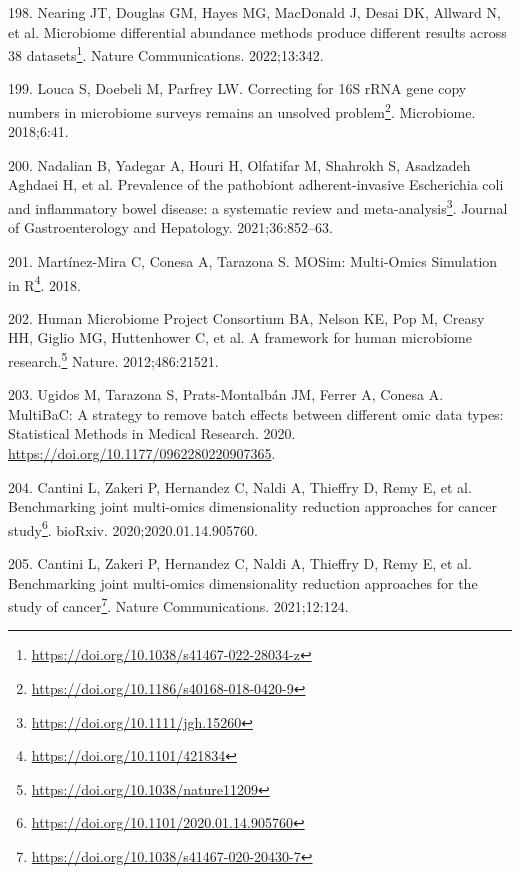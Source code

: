 \documentclass[
  a4paper,
]{book}
\DeclareRobustCommand{\href}[2]{#2\footnote{\url{#1}}}
\newlength{\cslhangindent}
\newlength{\cslentryspacingunit} %
\newenvironment{CSLReferences}[2] %
 {%
  \setlength{\parindent}{0pt}
  \ifodd #1
  \let\oldpar\par
  \def\par{\hangindent=\cslhangindent\oldpar}
  \fi
  \setlength{\parskip}{#2\cslentryspacingunit}
 }%
 {}
\begin{document}
\begin{CSLReferences}{0}{0}
\leavevmode{}%
198. Nearing JT, Douglas GM, Hayes MG, MacDonald J, Desai DK, Allward N, et al. \href{https://doi.org/10.1038/s41467-022-28034-z}{Microbiome differential abundance methods produce different results across 38 datasets}. Nature Communications. 2022;13:342.

\leavevmode{}%
199. Louca S, Doebeli M, Parfrey LW. \href{https://doi.org/10.1186/s40168-018-0420-9}{Correcting for 16S rRNA gene copy numbers in microbiome surveys remains an unsolved problem}. Microbiome. 2018;6:41.

\leavevmode{}%
200. Nadalian B, Yadegar A, Houri H, Olfatifar M, Shahrokh S, Asadzadeh Aghdaei H, et al. \href{https://doi.org/10.1111/jgh.15260}{Prevalence of the pathobiont adherent-invasive Escherichia coli and inflammatory bowel disease: a systematic review and meta-analysis}. Journal of Gastroenterology and Hepatology. 2021;36:852--63.

\leavevmode{}%
201. Martínez-Mira C, Conesa A, Tarazona S. \href{https://doi.org/10.1101/421834}{MOSim: Multi-Omics Simulation in R}. 2018.

\leavevmode{}%
202. Human Microbiome Project Consortium BA, Nelson KE, Pop M, Creasy HH, Giglio MG, Huttenhower C, et al. \href{https://doi.org/10.1038/nature11209}{A framework for human microbiome research.} Nature. 2012;486:21521.

\leavevmode{}%
203. Ugidos M, Tarazona S, Prats-Montalbán JM, Ferrer A, Conesa A. MultiBaC: A strategy to remove batch effects between different omic data types: Statistical Methods in Medical Research. 2020. \url{https://doi.org/10.1177/0962280220907365}.

\leavevmode{}%
204. Cantini L, Zakeri P, Hernandez C, Naldi A, Thieffry D, Remy E, et al. \href{https://doi.org/10.1101/2020.01.14.905760}{Benchmarking joint multi-omics dimensionality reduction approaches for cancer study}. bioRxiv. 2020;2020.01.14.905760.

\leavevmode{}%
205. Cantini L, Zakeri P, Hernandez C, Naldi A, Thieffry D, Remy E, et al. \href{https://doi.org/10.1038/s41467-020-20430-7}{Benchmarking joint multi-omics dimensionality reduction approaches for the study of cancer}. Nature Communications. 2021;12:124.


\end{CSLReferences}
\end{document}
